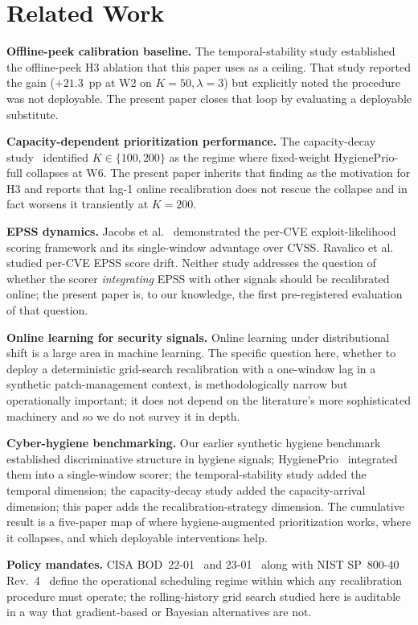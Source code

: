 \section{Related Work}

\textbf{Offline-peek calibration baseline.} The temporal-stability study
established the offline-peek H3 ablation that this paper uses as a
ceiling. That study reported the gain ($+21.3$~pp at W2 on $K=50,
\lambda=3$) but explicitly noted the procedure was not deployable.
The present paper closes that loop by evaluating a deployable
substitute.

\textbf{Capacity-dependent prioritization performance.}
The capacity-decay study~\cite{paper6capacity} identified $K \in \{100, 200\}$ as
the regime where fixed-weight HygienePrio-full collapses at W6.
The present paper inherits that finding as the motivation for
H3 and reports that lag-1 online recalibration does not rescue
the collapse and in fact worsens it transiently at $K = 200$.

\textbf{EPSS dynamics.} Jacobs et al.~\cite{jacobs2021epss,jacobs2020improving}
demonstrated the per-CVE exploit-likelihood scoring framework and
its single-window advantage over CVSS. Ravalico
et al.~\cite{ravalico2025epsstemporal} studied per-CVE EPSS score
drift. Neither study addresses the question of whether the scorer
\textit{integrating} EPSS with other signals should be recalibrated
online; the present paper is, to our knowledge, the first
pre-registered evaluation of that question.

\textbf{Online learning for security signals.} Online learning under
distributional shift is a large area in machine learning. The
specific question here, whether to deploy a deterministic
grid-search recalibration with a one-window lag in a synthetic
patch-management context, is methodologically narrow but
operationally important; it does not depend on the literature's
more sophisticated machinery and so we do not survey it in depth.

\textbf{Cyber-hygiene benchmarking.} Our earlier synthetic hygiene
benchmark established discriminative structure in hygiene signals;
HygienePrio~\cite{paper4hygieneprio} integrated them into a single-window
scorer; the temporal-stability study added the temporal dimension; the capacity-decay study added the
capacity-arrival dimension; this paper adds the recalibration-strategy
dimension. The cumulative result is a five-paper map of where
hygiene-augmented prioritization works, where it collapses, and
which deployable interventions help.

\textbf{Policy mandates.} CISA BOD~22-01~\cite{cisa2021bod2201} and
23-01~\cite{cisa2022bod2301} along with NIST
SP~800-40 Rev.~4~\cite{nist2022sp80040r4} define the operational
scheduling regime within which any recalibration procedure must
operate; the rolling-history grid search studied here is auditable
in a way that gradient-based or Bayesian alternatives are not.
